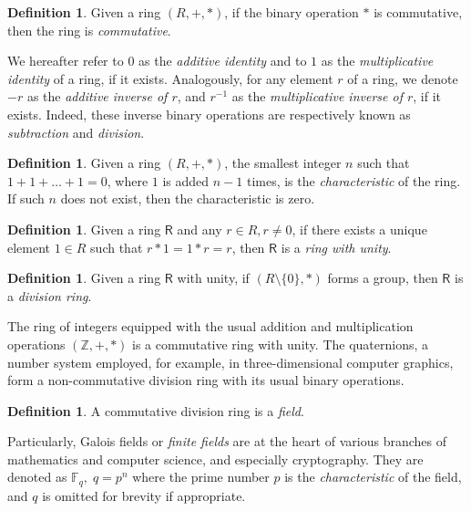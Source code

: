 \documentclass[12pt, a4paper, oneside]{memoir}
\theoremstyle{definition}
\newtheorem{definition}[theorem]{Definition}
\begin{document}
\begin{definition}
  Given a ring $(R, +, \ast)$, if the binary operation $\ast$ is commutative, then the ring is \emph{commutative}.
\end{definition}

We hereafter refer to $0$ as the \emph{additive identity} and to $1$ as the \emph{multiplicative identity} of a ring, if it exists. Analogously, for any element $r$ of a ring, we denote $-r$ as the \emph{additive inverse of $r$}, and $r^{-1}$ as the \emph{multiplicative inverse of $r$}, if it exists. Indeed, these inverse binary operations are respectively known as \emph{subtraction} and \emph{division}.

\begin{definition}
  Given a ring $(R, +, \ast)$, the smallest integer $n$ such that $1 + 1 + \dots + 1 = 0$, where $1$ is added $n - 1$ times, is the \emph{characteristic} of the ring. If such $n$ does not exist, then the characteristic is zero.
\end{definition}

\begin{definition}
  Given a ring $\mathsf{R}$ and any $r \in R, r \neq 0$, if there exists a unique element $1 \in R$ such that $r \ast 1 = 1 \ast r = r$, then $\mathsf{R}$ is a \emph{ring with unity}.
\end{definition}

\begin{definition}
  Given a ring $\mathsf{R}$ with unity, if $(R \setminus \{0\}, \ast)$ forms a group, then $\mathsf{R}$ is a \emph{division ring}.
\end{definition}

The ring of integers equipped with the usual addition and multiplication operations $(\mathbb{Z}, +, \ast)$ is a commutative ring with unity. The quaternions, a number system employed, for example, in three-dimensional computer graphics, form a non-commutative division ring with its usual binary operations.

\begin{definition}
  A commutative division ring is a \emph{field}.
\end{definition}

Particularly, Galois fields or \emph{finite fields} are at the heart of various branches of mathematics and computer science, and especially cryptography. They are denoted as $\mathbb{F}_{q},\; q = p^{n}$ where the prime number $p$ is the \emph{characteristic} of the field, and $q$ is omitted for brevity if appropriate.
\end{document}
